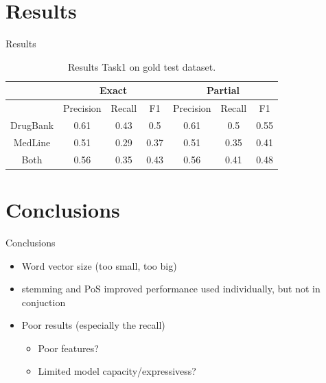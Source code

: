 \documentclass[11pt]{beamer}
\begin{document}
\section{Results}
\begin{frame}{Results}
\begin{table}
\begin{tabular}{c|ccc|ccc}
\toprule
& \multicolumn{3}{c}{Exact} & \multicolumn{3}{c}{Partial}\\
\midrule
& Precision & Recall & F1 & Precision & Recall & F1\\
\midrule
DrugBank & 0.61 &	0.43	& 0.5 & 0.61	& 0.5 &	0.55\\
MedLine & 0.51	& 0.29 & 0.37 & 0.51	& 0.35 &	0.41\\
Both& 0.56	& 0.35	& 0.43	& 0.56	& 0.41	& 0.48\\
\bottomrule
\end{tabular}
\caption{Results Task1 on gold test dataset.}
\end{table}
\end{frame}

\section{Conclusions}
\begin{frame}{Conclusions}
\begin{itemize}
\item Word vector size (too small, too big)
\item stemming and PoS improved performance used individually, but not in conjuction
\item Poor results (especially the recall)
\begin{itemize}
\item Poor features?
\item Limited model capacity/expressivess?
\end{itemize}
\end{itemize}
\end{frame}
\end{document}
